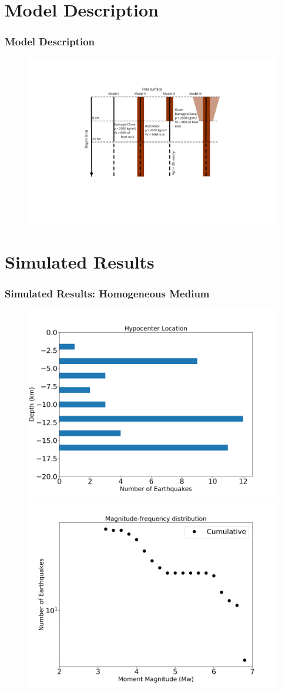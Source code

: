 \documentclass{beamer}
\begin{document}
\section{Model Description}
\begin{frame}
    \frametitle{Model Description}
    \begin{figure}
        \includegraphics[width=1\linewidth]{images/fig2}
    \end{figure}
\end{frame}

\section{Simulated Results}
\begin{frame}
    \frametitle{Simulated Results: Homogeneous Medium}
    \begin{figure}
        \includegraphics[width=0.5\linewidth]{images/homodc4.png} 
        \includegraphics[width=0.5\linewidth]{images/homodc4_mfd.png} 
    \end{figure}
\end{frame}
\end{document}
